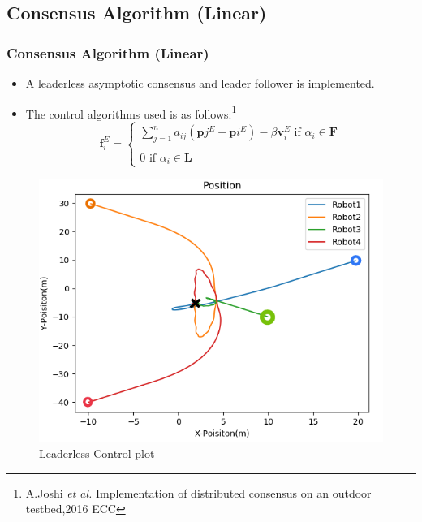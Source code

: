 \documentclass[10pt]{beamer}
\begin{document}
\subsection*{Consensus Algorithm (Linear)}
\begin{frame}
	\frametitle{Consensus Algorithm (Linear)}
	\begin{itemize}
		\item A leaderless asymptotic consensus and leader follower is implemented.
		\item The control algorithms used is as follows:\footnote{A.Joshi\textit{ et al.} Implementation of distributed consensus on an outdoor testbed,2016 ECC}
		      \begin{equation*}
			      \textbf{f}_{i}^{E}=\left\{\begin{array}{l}
				      \sum_{j = 1}^{n} a_{ij}\left(\mathbf{p}{j}^{E}-\mathbf{p}{i}^{E}\right)-\beta \textbf{v}_{i}^{E} \text { if } \alpha_{i} \in \mathbf{F} \\
				      \\
				      0 \text { if }  \alpha_{i} \in \mathbf{L}
			      \end{array}\right.
		      \end{equation*}
	\end{itemize}
	\pause
	\begin{minipage}{0.47\textwidth}
		\begin{figure}[h!]
			\centering
			\includegraphics[scale=0.27]{Position.png}
			\caption{Leaderless Control plot}
			\label{Fig:pos_x_c}
		\end{figure}
	\end{minipage}

\end{frame}
\end{document}
